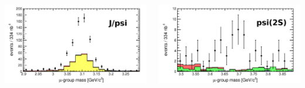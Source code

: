 \documentclass[compress]{beamer}
\begin{document}
\begin{frame}
\begin{columns}
\includegraphics[width=\linewidth]{Mu5_mass_jpsi.png}

\includegraphics[width=\linewidth]{Mu5_mass_psi2s.png}

\end{columns}
\label{numpages}
\end{frame}







\end{document}
